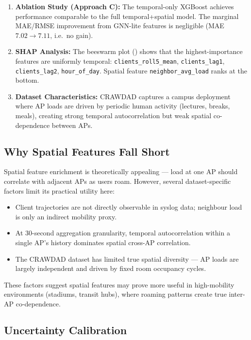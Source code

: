 \documentclass[12pt,a4paper]{article}
\newcommand{\code}[1]{\texttt{\small#1}}
\begin{document}
\begin{enumerate}[noitemsep, topsep=4pt]
    \item \textbf{Ablation Study (Approach C):} The temporal-only XGBoost achieves performance comparable to the full temporal+spatial model. The marginal MAE/RMSE improvement from GNN-lite features is negligible (MAE $7.02 \to 7.11$, i.e.\ no gain).
    \item \textbf{SHAP Analysis:} The beeswarm plot () shows that the highest-importance features are uniformly temporal: \code{clients\_roll5\_mean}, \code{clients\_lag1}, \code{clients\_lag2}, \code{hour\_of\_day}. Spatial feature \code{neighbor\_avg\_load} ranks at the bottom.
    \item \textbf{Dataset Characteristics:} CRAWDAD captures a campus deployment where AP loads are driven by periodic human activity (lectures, breaks, meals), creating strong temporal autocorrelation but weak spatial co-dependence between APs.
\end{enumerate}

\subsection{Why Spatial Features Fall Short}

Spatial feature enrichment is theoretically appealing — load at one AP should correlate with adjacent APs as users roam. However, several dataset-specific factors limit its practical utility here:
\begin{itemize}[noitemsep, topsep=3pt]
    \item Client trajectories are not directly observable in syslog data; neighbour load is only an indirect mobility proxy.
    \item At 30-second aggregation granularity, temporal autocorrelation within a single AP's history dominates spatial cross-AP correlation.
    \item The CRAWDAD dataset has limited true spatial diversity — AP loads are largely independent and driven by fixed room occupancy cycles.
\end{itemize}
These factors suggest spatial features may prove more useful in high-mobility environments (stadiums, transit hubs), where roaming patterns create true inter-AP co-dependence.

\subsection{Uncertainty Calibration}
\end{document}
